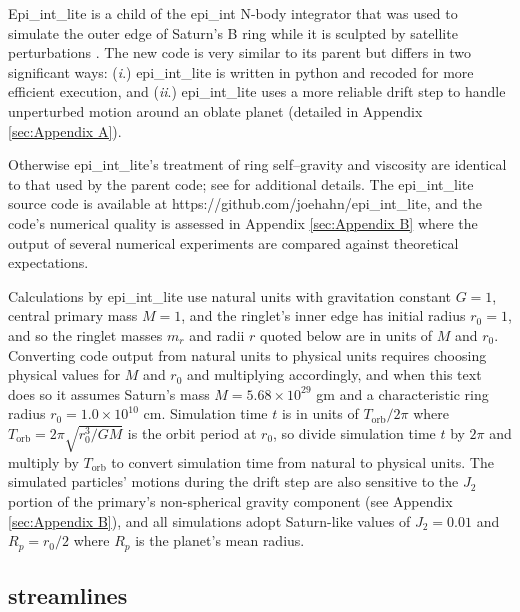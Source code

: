 \documentclass[preprint]{aastex62}
\begin{document}
Epi\_int\_lite is a child of the epi\_int N-body integrator that was used to
simulate the outer edge of Saturn's B ring while it is sculpted by satellite perturbations
\citep{HS13}. The new code is very similar to its parent but differs in two significant ways:
({\it i}.) epi\_int\_lite is written in python and recoded for more efficient execution, and
({\it ii}.) epi\_int\_lite uses a more reliable drift step to handle
unperturbed motion around an oblate planet (detailed in Appendix \ref{sec:Appendix A}).

Otherwise epi\_int\_lite's treatment of ring self--gravity and viscosity are identical
to that used by the parent code; see \cite{HS13} for additional details. The epi\_int\_lite 
source code is available at https://github.com/joehahn/epi\_int\_lite, and the
code's numerical quality is assessed in Appendix \ref{sec:Appendix B}
where the output of several numerical experiments are compared against theoretical expectations.

Calculations by epi\_int\_lite use natural units with gravitation constant $G=1$, 
central primary mass $M=1$, and the ringlet's inner edge has initial radius
$r_0=1$, and so the ringlet masses $m_r$ and radii $r$ quoted below are in units of $M$ and $r_0$.
Converting code output from natural units to physical units requires choosing	
physical values for $M$ and $r_0$ and multiplying accordingly, and when this text does so
it assumes Saturn's mass $M=5.68\times10^{29}$ gm and a characteristic
ring radius $r_0=1.0\times10^{10}$ cm. Simulation time $t$ is in units of $T_{\text{orb}}/2\pi$
where $T_{\text{orb}} = 2\pi\sqrt{r_0^3/GM}$ is the orbit period at $r_0$, 
so divide simulation time $t$ by $2\pi$ and multiply
by $T_{\text{orb}}$ to convert simulation time from natural to physical units.
The simulated particles' motions during the drift step are also
sensitive to the $J_2$ portion of the primary's non-spherical gravity component 
(see Appendix \ref{sec:Appendix B}), and all simulations
adopt Saturn-like values of $J_2=0.01$ and $R_p=r_0/2$ where $R_p$ is the planet's
mean radius.

\subsection{streamlines}
\label{subsec:streamlines}
\end{document}
